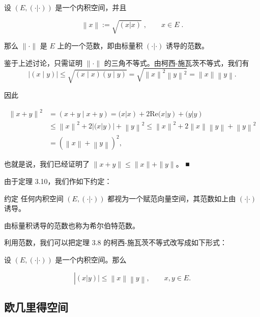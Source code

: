 \begin{theorem}

设 $ (E, (\cdot | \cdot)) $ 是一个内积空间，并且

\[
\left\|x\right\|:=\sqrt{\left(x\left|x\right.\right)}\;,\qquad x\in E\;.
\]

那么 $ \|\cdot\| $ 是 $ E $ 上的一个范数，即由标量积 $ (\cdot|\cdot) $ 诱导的范数。

\proofhead
鉴于上述讨论，只需证明 $ \|\cdot\| $ 的三角不等式。由柯西-施瓦茨不等式，我们有
\[
\left|(x\mid y)\right|\leq\sqrt{(x\mid x)(y\mid y)}=\sqrt{\left\|x\right\|^{2}\left\|y\right\|^{2}}=\left\|x\right\|\left\|y\right\|.
\]

因此

\begin{equation*}
\begin{aligned}
\left\|x+y\right\|^{2}&=(x+y\mid x+y)=(x\left|x\right)+2\mathrm{Re}(x\left|y\right)+(y\left|y\right)\\&\leq\left\|x\right\|^{2}+2\left|(x\left|y\right)\right|+\left\|y\right\|^{2}\leq\left\|x\right\|^{2}+2\left\|x\right\|\left\|y\right\|+\left\|y\right\|^{2}\\&=(\left\|x\right\|+\left\|y\right\|)^{2},
\end{aligned}
\end{equation*}

也就是说，我们已经证明了 $ \|x + y\| \leq \|x\| + \|y\| $。 ■

\end{theorem}

由于定理 3.10，我们作如下约定：

约定 任何内积空间 $ (E, (\cdot|\cdot)) $ 都视为一个赋范向量空间，其范数如上由 $ (\cdot|\cdot) $ 诱导。

由标量积诱导的范数也称为希尔伯特范数。

利用范数，我们可以把定理 3.8 的柯西-施瓦茨不等式改写成如下形式：

\begin{corollary}

设 $ (E, (\cdot|\cdot)) $ 是一个内积空间。那么

\[
\left|\left(x\left|y\right)\right|\leq\left\|x\right\|\left\|y\right\|,\qquad x,y\in E. \right.
\]
\end{corollary}

\subsection*{欧几里得空间}

